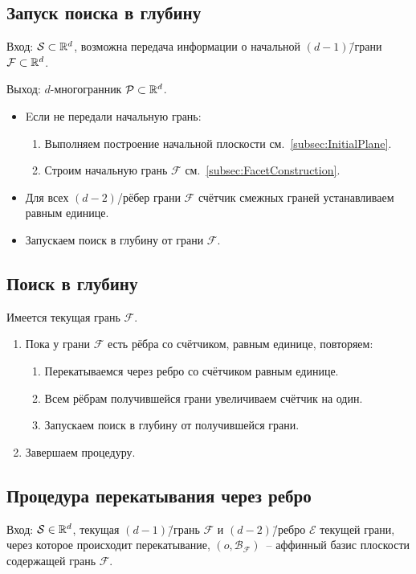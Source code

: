 \documentclass[a4paper,12pt]{article}
\newcommand{\R}[1][]{%
  \ifthenelse{\equal{#1}{}}%
  {\mathbb{R}}%
  {\mathbb{R}^{#1}}}
\newcommand{\Swarm}{\mathcal{S}}              %
\newcommand{\Polyhedron}{\mathcal{P}}         %
\newcommand{\Facet}{\mathcal{F}}              %
\newcommand{\Edge}{\mathcal{E}}               %
\newcommand{\Basis}{\mathcal{B}}              %
\renewcommand{\.}{\hspace{0.2ex}}
\begin{document}
  \subsection{Запуск поиска в глубину}

    Вход: $\Swarm \subset \R[d]$, возможна передача информации о начальной $(d-1)$\=/грани $\Facet \subset \R[d]$.

    Выход: $d$-многогранник $\Polyhedron \subset \R[d]$.

    \begin{itemize}
      \item Eсли не передали начальную грань:
      \begin{enumerate}
        \item Выполняем построение начальной плоскости см.~\ref{subsec:InitialPlane}.
        \item Строим начальную грань $\Facet$ см.~\ref{subsec:FacetConstruction}.
      \end{enumerate}
      \item Для всех $(d-2)$\-/рёбер грани $\Facet$ счётчик смежных граней устанавливаем равным единице.
      \item Запускаем поиск в глубину от грани $\Facet$.
    \end{itemize}




  \subsection{Поиск в глубину}

    Имеется текущая грань $\Facet$.
    \begin{enumerate}
      \item Пока у грани $\Facet$ есть рёбра со счётчиком, равным единице, повторяем:
      \begin{enumerate}
        \item Перекатываемся через ребро со счётчиком равным единице.
        \item Всем рёбрам получившейся грани увеличиваем счётчик на один.
        \item Запускаем поиск в глубину от получившейся грани.
      \end{enumerate}
      \item Завершаем процедуру.
    \end{enumerate}

  \subsection{Процедура перекатывания через ребро}
    Вход: $\Swarm \in \R[d]$, текущая $(d-1)$\=/грань $\Facet$ и $(d-2)$\=/ребро $\Edge$ текущей грани, через которое происходит перекатывание, $(o, \Basis_{\Facet})$~-- аффинный базис плоскости содержащей грань $\Facet$.
\end{document}
